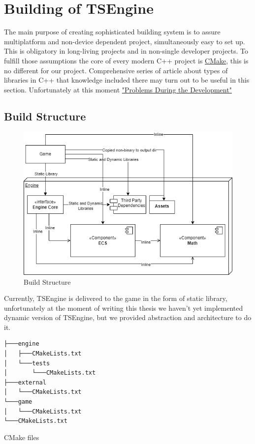 \newpage
\section{Building of TSEngine}
\label{sec:build}
The main purpose of creating sophisticated building system is to assure multiplatform and non-device dependent project, simultaneously easy to set up.\\ This is obligatory in long-living projects and in non-single developer projects.
To fulfill those assumptions the core of every modern C++ project is \hyperref[sec:stack_cmake]{CMake}, this is no different for our project.
Comprehensive series of article about types of libraries in C++ \cite{cpplibs} that knowledge included there may turn out to be useful in this section.
Unfortunately at this moment \hyperref[sec:problems]{"Problems During the Development"}
\subsection{Build Structure}
\label{sec:build_struct}
\begin{figure}
  \includegraphics[width=\linewidth]{figures/build.png}
  \caption{Build Structure}
\end{figure}
Currently, TSEngine is delivered to the game in the form of static library, unfortunately at the moment of writing this thesis we haven't yet implemented dynamic version of TSEngine, but we provided abstraction and architecture to do it.
\begin{verbatim}
├───engine
│   ├───CMakeLists.txt
│   └───tests
│       └───CMakeLists.txt
├───external
│   └───CMakeLists.txt
└───game
│   └───CMakeLists.txt
└───CMakeLists.txt
\end{verbatim}
\begin{table}[h]
\caption{CMake files}
\end{table}
\newpage
